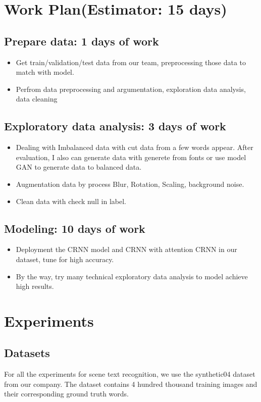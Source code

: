 \documentclass[14pt]{extarticle}
\newcommand{\<}{\langle}
\renewcommand{\>}{\rangle}
\theoremstyle{definition}
\begin{document}
\section{Work Plan(Estimator: 15 days)}
\subsection{Prepare data: 1 days of work}
\begin{itemize}
    \item Get train/validation/test data from our team, preprocessing those data to match with model. 
    \item Perfrom data preprocessing and argumentation, exploration data analysis, data cleaning
\end{itemize}
\subsection{Exploratory data analysis: 3 days of work}
\begin{itemize}
    \item Dealing with Imbalanced data with cut data from a few words appear. After evaluation, I also can generate data with generete from fonts or use model GAN to generate data to balanced data. 
    \item Augmentation data by process Blur, Rotation, Scaling, background noise. 
    \item Clean data with check null in label. 
\end{itemize}
\subsection{ Modeling: 10 days of work}
\begin{itemize}
    \item Deployment the CRNN model and CRNN with attention CRNN in our dataset, tune for high accuracy. 
    \item By the way, try many technical exploratory data analysis to model achieve high results. 
\end{itemize}
\section{Experiments}
\subsection{Datasets}
For all the experiments for scene text recognition, we use the synthetic04 dataset from our company. The dataset contains 4 hundred thousand training images and their corresponding ground truth words.
\end{document}
